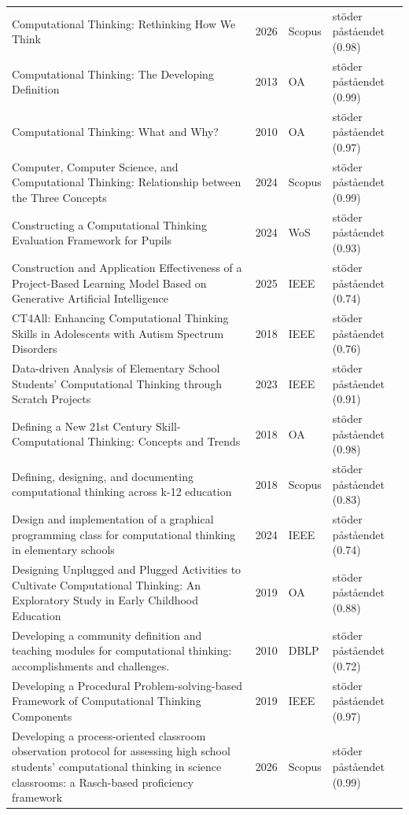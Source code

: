 \begin{longtable}{@{}%
  >{\raggedright\arraybackslash}p{}c%
  >{\raggedright\arraybackslash}p{}%
  >{\raggedright\arraybackslash}p{}@{}}
Computational Thinking: Rethinking How We Think & 2026 & Scopus & stöder påståendet (0.98) \\
Computational Thinking: The Developing Definition & 2013 & OA & stöder påståendet (0.99) \\
Computational Thinking: What and Why? & 2010 & OA & stöder påståendet (0.97) \\
Computer, Computer Science, and Computational Thinking: Relationship between the Three Concepts & 2024 & Scopus & stöder påståendet (0.99) \\
Constructing a Computational Thinking Evaluation Framework for Pupils & 2024 & WoS & stöder påståendet (0.93) \\
Construction and Application Effectiveness of a Project-Based Learning Model Based on Generative Artificial Intelligence & 2025 & IEEE & stöder påståendet (0.74) \\
CT4All: Enhancing Computational Thinking Skills in Adolescents with Autism Spectrum Disorders & 2018 & IEEE & stöder påståendet (0.76) \\
Data-driven Analysis of Elementary School Students' Computational Thinking through Scratch Projects & 2023 & IEEE & stöder påståendet (0.91) \\
Defining a New 21st Century Skill-Computational Thinking: Concepts and Trends & 2018 & OA & stöder påståendet (0.98) \\
Defining, designing, and documenting computational thinking across k-12 education & 2018 & Scopus & stöder påståendet (0.83) \\
Design and implementation of a graphical programming class for computational thinking in elementary schools & 2024 & IEEE & stöder påståendet (0.74) \\
Designing Unplugged and Plugged Activities to Cultivate Computational Thinking: An Exploratory Study in Early Childhood Education & 2019 & OA & stöder påståendet (0.88) \\
Developing a community definition and teaching modules for computational thinking: accomplishments and challenges. & 2010 & DBLP & stöder påståendet (0.72) \\
Developing a Procedural Problem-solving-based Framework of Computational Thinking Components & 2019 & IEEE & stöder påståendet (0.97) \\
Developing a process-oriented classroom observation protocol for assessing high school students' computational thinking in science classrooms: a Rasch-based proficiency framework & 2026 & Scopus & stöder påståendet (0.99) \\

\end{longtable}
